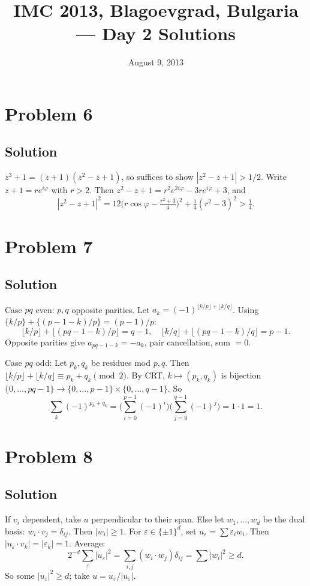 \documentclass{article}
\title{IMC 2013, Blagoevgrad, Bulgaria --- Day 2 Solutions}
\date{August 9, 2013}
\begin{document}
\maketitle

\section*{Problem 6}
\subsection*{Solution}
$z^3 + 1 = (z+1)(z^2 - z + 1)$, so suffices to show $|z^2 - z + 1| > 1/2$. Write $z + 1 = r e^{i\varphi}$ with $r > 2$. Then $z^2 - z + 1 = r^2 e^{2i\varphi} - 3 r e^{i\varphi} + 3$, and
\[ |z^2 - z + 1|^2 = 12\Big(r\cos\varphi - \tfrac{r^2+3}{4}\Big)^2 + \tfrac{1}{4}(r^2 - 3)^2 > \tfrac{1}{4}. \]

\section*{Problem 7}
\subsection*{Solution}
Case $pq$ even: $p, q$ opposite parities. Let $a_k = (-1)^{\lfloor k/p\rfloor + \lfloor k/q\rfloor}$. Using $\{k/p\} + \{(p-1-k)/p\} = (p-1)/p$:
\[ \lfloor k/p \rfloor + \lfloor (pq-1-k)/p \rfloor = q - 1, \quad \lfloor k/q \rfloor + \lfloor (pq-1-k)/q \rfloor = p - 1. \]
Opposite parities give $a_{pq-1-k} = -a_k$, pair cancellation, sum $= 0$.

Case $pq$ odd: Let $p_k, q_k$ be residues mod $p, q$. Then $\lfloor k/p \rfloor + \lfloor k/q \rfloor \equiv p_k + q_k \pmod 2$. By CRT, $k \mapsto (p_k, q_k)$ is bijection $\{0,\dots,pq-1\} \to \{0,\dots,p-1\}\times\{0,\dots,q-1\}$. So
\[ \sum_k (-1)^{p_k + q_k} = \Big(\sum_{i=0}^{p-1}(-1)^i\Big)\Big(\sum_{j=0}^{q-1}(-1)^j\Big) = 1 \cdot 1 = 1. \]

\section*{Problem 8}
\subsection*{Solution}
If $v_i$ dependent, take $u$ perpendicular to their span. Else let $w_1, \dots, w_d$ be the dual basis: $w_i \cdot v_j = \delta_{ij}$. Then $|w_i| \ge 1$. For $\varepsilon \in \{\pm 1\}^d$, set $u_\varepsilon = \sum \varepsilon_i w_i$. Then $|u_\varepsilon \cdot v_k| = |\varepsilon_k| = 1$. Average:
\[ 2^{-d}\sum_\varepsilon |u_\varepsilon|^2 = \sum_{i,j}(w_i \cdot w_j)\delta_{ij} = \sum |w_i|^2 \ge d. \]
So some $|u_\varepsilon|^2 \ge d$; take $u = u_\varepsilon/|u_\varepsilon|$.
\end{document}
